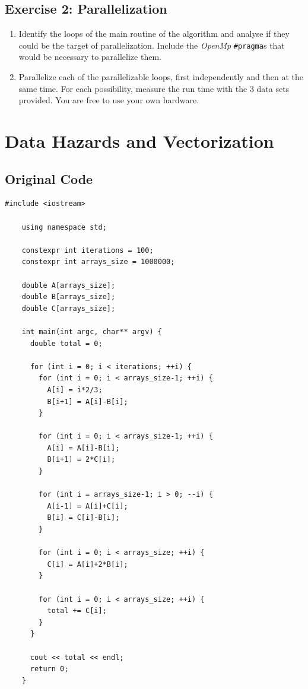 \documentclass[
    12pt, %
]{fphw}
\newcommand{\tech}{\texttt}
\newcommand{\OpenMp}{\textit{OpenMp}}
\begin{document}
\subsection*{Exercise 2: Parallelization}

\begin{enumerate}
    \item Identify the loops of the main routine of the algorithm and
    analyse if they could be the target of parallelization.
    Include the \OpenMp{} \tech{\#pragma}s that would be necessary to parallelize them.

    \item Parallelize each of the parallelizable loops,
    first independently and then at the same time.
    For each possibility, measure the run time with the $3$ data sets provided.
    You are free to use your own hardware.
\end{enumerate}


\section{Data Hazards and Vectorization}

\subsection{Original Code}

\begin{lstlisting}[gobble=4]
    #include <iostream>

    using namespace std;

    constexpr int iterations = 100;
    constexpr int arrays_size = 1000000;

    double A[arrays_size];
    double B[arrays_size];
    double C[arrays_size];

    int main(int argc, char** argv) {
      double total = 0;

      for (int i = 0; i < iterations; ++i) {
        for (int i = 0; i < arrays_size-1; ++i) {
          A[i] = i*2/3;
          B[i+1] = A[i]-B[i];
        }

        for (int i = 0; i < arrays_size-1; ++i) {
          A[i] = A[i]-B[i];
          B[i+1] = 2*C[i];
        }

        for (int i = arrays_size-1; i > 0; --i) {
          A[i-1] = A[i]+C[i];
          B[i] = C[i]-B[i];
        }

        for (int i = 0; i < arrays_size; ++i) {
          C[i] = A[i]+2*B[i];
        }

        for (int i = 0; i < arrays_size; ++i) {
          total += C[i];
        }
      }

      cout << total << endl;
      return 0;
    }
\end{lstlisting}
\end{document}
